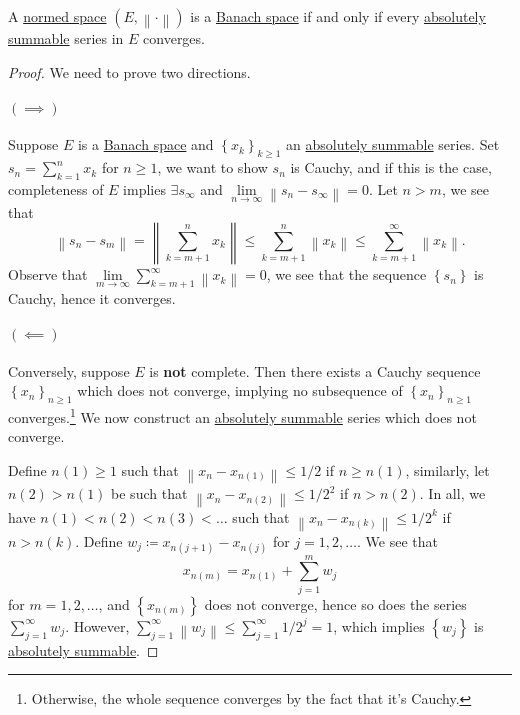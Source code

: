 \begin{theorem}\label{thm:criterion-for-completeness}
	A \hyperref[def:normed-vector-space]{normed space} \(( E, \left\lVert \cdot\right\rVert )\) is a \hyperref[def:Banach-space]{Banach space} if and only if every \hyperref[def:absolutely-summable]{absolutely summable} series in \(E\) converges.
\end{theorem}
\begin{proof}
	We need to prove two directions.

	\paragraph{\((\implies )\)}
	Suppose \(E\) is a \hyperref[def:Banach-space]{Banach space} and \(\left\{ x_{k} \right\}_{k \geq 1}\) an \hyperref[def:absolutely-summable]{absolutely summable} series. Set \(s_n = \sum_{k=1}^{n} x_{k} \) for \(n \geq 1\), we want to show \(s_n\) is Cauchy, and if this is the case, completeness of \(E\) implies \(\exists s_{\infty }\) and \(\lim\limits_{n \to \infty} \left\lVert s_n - s_{\infty }\right\rVert = 0\). Let \(n > m\), we see that
	\[
		\left\lVert s_n - s_m\right\rVert = \left\lVert \sum_{k=m+1}^{n} x_k\right\rVert \leq \sum_{k=m+1}^{n} \left\lVert x_k\right\rVert \leq \sum_{k=m+1}^{\infty} \left\lVert x_k\right\rVert.
	\]
	Observe that \(\lim\limits_{m \to \infty} \sum\limits_{k=m+1}^{\infty} \left\lVert x_k\right\rVert = 0\), we see that the sequence \(\left\{ s_n \right\} \) is Cauchy, hence it converges.

	\paragraph{\((\impliedby)\)}
	Conversely, suppose \(E\) is \textbf{not} complete. Then there exists a Cauchy sequence \(\left\{ x_n \right\}_{ n \geq 1} \) which does not converge, implying no subsequence of \(\left\{ x_n \right\}_{n \geq 1} \) converges.\footnote{Otherwise, the whole sequence converges by the fact that it's Cauchy.} We now construct an \hyperref[def:absolutely-summable]{absolutely summable} series which does not converge.

	Define \(n(1) \geq 1\) such that \(\left\lVert x_n - x_{n(1)}\right\rVert \leq 1 / 2\) if \(n \geq n(1)\), similarly, let \(n(2) > n(1)\) be such that \(\left\lVert x_n - x_{n(2)}\right\rVert \leq 1 / 2^2\) if \( n > n(2)\). In all, we have \(n(1) < n(2) < n(3) < \ldots  \) such that \(\left\lVert x_n - x_{n(k)}\right\rVert \leq 1 / 2^k\) if \(n > n(k)\). Define \(w_j \coloneqq x_{n(j+1)} - x_{n(j)}\) for \(j = 1, 2, \ldots  \). We see that
	\[
		x_{n(m)} = x_{n(1)} + \sum_{j=1}^{m} w_j
	\]
	for \(m = 1, 2, \ldots\), and \(\left\{ x_{n(m)} \right\} \) does not converge, hence so does the series \(\sum_{j=1}^{\infty} w_j\). However, \(\sum_{j=1}^{\infty} \left\lVert w_j\right\rVert \leq \sum_{j=1}^{\infty} 1 / 2^j = 1\), which implies \(\left\{ w_j \right\} \) is \hyperref[def:absolutely-summable]{absolutely summable}.
\end{proof}

